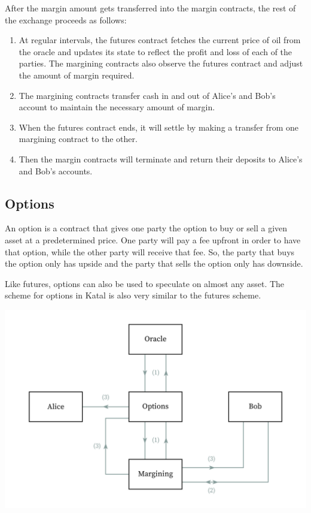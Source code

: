 \documentclass[conference]{IEEEtran}
\begin{document}
After the margin amount gets transferred into the margin contracts, the rest of the exchange proceeds as follows:

\begin{enumerate}
	\item At regular intervals, the futures contract fetches the current price of oil from the oracle and updates its state to reflect the profit and loss of each of the parties. The margining contracts also observe the futures contract and adjust the amount of margin required.
	\item The margining contracts transfer cash in and out of Alice's and Bob's account to maintain the necessary amount of margin.
	\item When the futures contract ends, it will settle by making a transfer from one margining contract to the other.
	\item Then the margin contracts will terminate and return their deposits to Alice's and Bob's accounts.
\end{enumerate}

\subsection{Options}
An option is a contract that gives one party the option to buy or sell a given asset at a predetermined price. One party will pay a fee upfront in order to have that option, while the other party will receive that fee. So, the party that buys the option only has upside and the party that sells the option only has downside.

Like futures, options can also be used to speculate on almost any asset. The scheme for options in Katal is also very similar to the futures scheme.

\includegraphics[width=\linewidth]{images/options.jpg}
\end{document}
